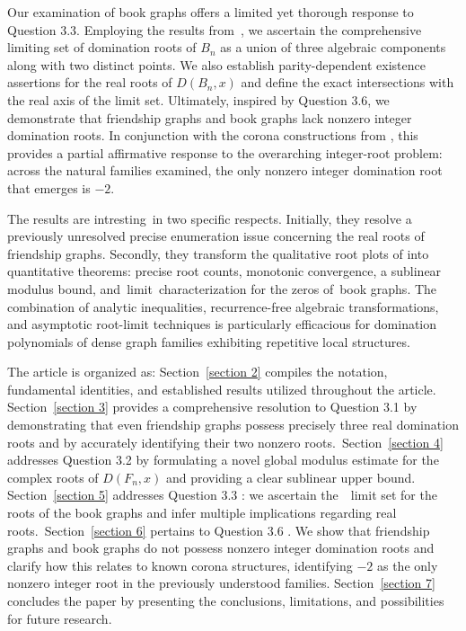 \documentclass[12pt]{article}
\theoremstyle{definition}
\begin{document}
	Our examination of book graphs offers a limited yet thorough response to Question 3.3. Employing the results from \cite{BerahaKahaneWeiss1978,BrownHickman2002}, we ascertain the comprehensive limiting set of domination roots of $B_n$ as a union of three algebraic components along with two distinct points. We also establish parity-dependent existence assertions for the real roots of $D(B_n,x)$ and define the exact intersections with the real axis of the limit set. Ultimately, inspired by Question 3.6, we demonstrate that friendship graphs and book graphs lack nonzero integer domination roots. In conjunction with the corona constructions from \cite{AlikhaniBrownJahari2016}, this provides a partial affirmative response to the overarching integer-root problem: across the natural families examined, the only nonzero integer domination root that emerges is $-2$.
	
	The results are intresting in two specific respects. Initially, they resolve a previously unresolved precise enumeration issue concerning the real roots of friendship graphs. Secondly, they transform the qualitative root plots of \cite{AlikhaniBrownJahari2016} into quantitative theorems: precise root counts, monotonic convergence, a sublinear modulus bound, and limit characterization for the zeros of book graphs. The combination of analytic inequalities, recurrence-free algebraic transformations, and asymptotic root-limit techniques is particularly efficacious for domination polynomials of dense graph families exhibiting repetitive local structures.
	
	\medskip
	The article is organized as: Section~\ref{section 2} compiles the notation, fundamental identities, and established results utilized throughout the article. Section~\ref{section 3} provides a comprehensive resolution to Question 3.1 \cite{AlikhaniBrownJahari2016} by demonstrating that even friendship graphs possess precisely three real domination roots and by accurately identifying their two nonzero roots. Section~\ref{section 4} addresses Question 3.2 \cite{AlikhaniBrownJahari2016} by formulating a novel global modulus estimate for the complex roots of $D(F_n,x)$ and providing a clear sublinear upper bound. Section~\ref{section 5} addresses Question 3.3 \cite{AlikhaniBrownJahari2016}: we ascertain the  limit set for the roots of the book graphs and infer multiple implications regarding real roots. Section~\ref{section 6} pertains to Question 3.6 \cite{AlikhaniBrownJahari2016}. We show that friendship graphs and book graphs do not possess nonzero integer domination roots and clarify how this relates to known corona structures, identifying $-2$ as the only nonzero integer root in the previously understood families. Section~\ref{section 7} concludes the paper by presenting the conclusions, limitations, and possibilities for future research.
	
\end{document}
